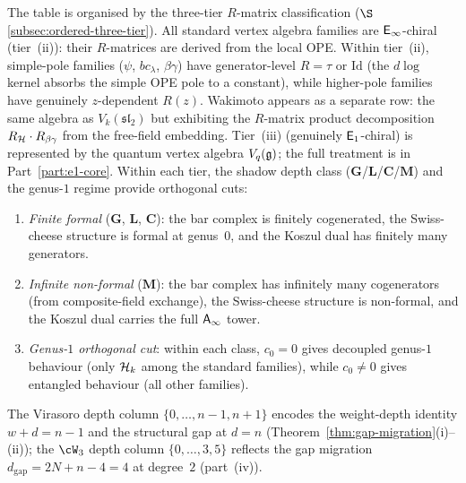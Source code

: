\begin{computation}
The table is organised by the three-tier $R$-matrix
classification
($\S$\ref{subsec:ordered-three-tier}).
All standard vertex algebra families are $\mathsf{E}_{\infty}$-chiral
(tier~(ii)): their $R$-matrices are derived from the
local OPE\@. Within tier~(ii), simple-pole families
($\psi$, $bc_\lambda$, $\beta\gamma$) have
generator-level $R = \tau$ or $\mathrm{Id}$
(the $d\log$ kernel absorbs the simple OPE pole to
a constant), while higher-pole families have genuinely
$z$-dependent $R(z)$. Wakimoto appears as a separate
row: the same algebra as $V_k(\mathfrak{sl}_2)$ but
exhibiting the $R$-matrix product decomposition
$R_{\mathcal{H}} \cdot R_{\beta\gamma}$ from the free-field
embedding. Tier~(iii) (genuinely $\mathsf{E}_1$-chiral)
is represented by the quantum vertex algebra $V_q(\mathfrak{g})$;
the full treatment is in Part~\ref{part:e1-core}\@.
Within each tier, the shadow depth class
($\mathbf{G}$/$\mathbf{L}$/$\mathbf{C}$/$\mathbf{M}$)
and the genus-$1$ regime provide orthogonal cuts:

\begin{enumerate}[label=\textup{(\roman*)},nosep]
\item \emph{Finite formal} ($\mathbf{G}$, $\mathbf{L}$,
 $\mathbf{C}$): the bar complex is finitely cogenerated,
 the Swiss-cheese structure is formal at genus~$0$, and
 the Koszul dual has finitely many generators.
\item \emph{Infinite non-formal} ($\mathbf{M}$): the bar
 complex has infinitely many cogenerators
 (from composite-field exchange), the Swiss-cheese
 structure is non-formal, and the Koszul dual carries
 the full $\mathsf{A}_{\infty}$ tower.
\item \emph{Genus-$1$ orthogonal cut}: within each class,
 $c_0 = 0$ gives decoupled genus-$1$ behaviour (only
 $\mathcal{H}_k$ among the standard families), while $c_0 \ne 0$
 gives entangled behaviour (all other families).
\end{enumerate}
The Virasoro depth column $\{0,\ldots,n{-}1,n{+}1\}$ encodes the weight-depth identity $w + d = n - 1$ and the structural gap at $d = n$ (Theorem~\ref{thm:gap-migration}(i)--(ii)); the $\cW_3$ depth column $\{0,\ldots,3,5\}$ reflects the gap migration $d_{\mathrm{gap}} = 2N + n - 4 = 4$ at degree~$2$ (part~(iv)).
\end{computation}

